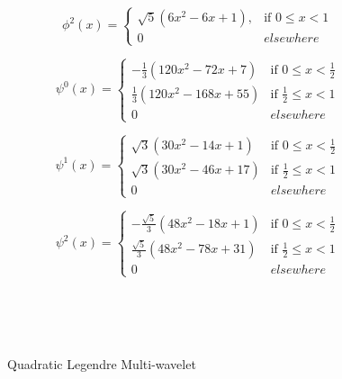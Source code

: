 \begin{equation}\label{eq:qlmwphi2}
\phi^2(x)=
\left\{
    \begin{array}{ll}
        \sqrt{5}(6x^2-6x+1),  & \mbox{if } 0 \leq x < 1 \\
        0 & elsewhere
    \end{array}
\right.
\end{equation}

\begin{equation}
\psi^0(x)=
\left\{
    \begin{array}{ll}
        -\frac{1}{3}(120x^2-72x+7)  & \mbox{if } 0 \leq x < \frac{1}{2} \\
        \frac{1}{3}(120x^2-168x+55)  & \mbox{if } \frac{1}{2} \leq x < 1 \\
        0 & elsewhere
    \end{array}
\right.
\end{equation}

\begin{equation}
\psi^1(x)=
\left\{
    \begin{array}{ll}
        \sqrt{3}(30x^2-14x+1)  & \mbox{if } 0 \leq x < \frac{1}{2} \\
        \sqrt{3}(30x^2-46x+17)  & \mbox{if } \frac{1}{2} \leq x < 1 \\
        0 & elsewhere
    \end{array}
\right.
\end{equation}

\begin{equation}
\psi^2(x)=
\left\{
    \begin{array}{ll}
        -\frac{\sqrt{5}}{3}(48x^2-18x+1)  & \mbox{if } 0 \leq x < \frac{1}{2} \\
        \frac{\sqrt{5}}{3}(48x^2-78x+31)  & \mbox{if } \frac{1}{2} \leq x < 1 \\
        0 & elsewhere
    \end{array}
\right.
\end{equation}
\begin{figure*}
\centering
{}
\\
\\
\\
\caption{Quadratic Legendre Multi-wavelet}
\label{fig:qlmwphipsi}
\end{figure*}



